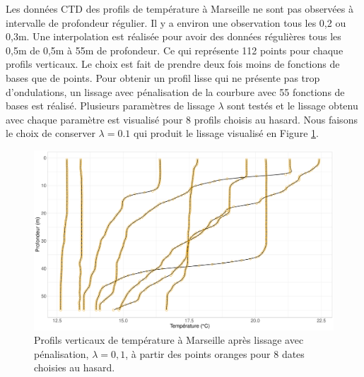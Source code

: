 \documentclass[12pt]{article}
\begin{document}
Les données CTD des profils de température à Marseille ne sont pas observées à intervalle de profondeur régulier. Il y a environ une observation tous les 0,2 ou 0,3m. Une interpolation est réalisée pour avoir des données régulières tous les 0,5m de 0,5m à 55m de profondeur. Ce qui représente 112 points pour chaque profils verticaux. Le choix est fait de prendre deux fois moins de fonctions de bases que de points. Pour obtenir un profil lisse qui ne présente pas trop d'ondulations, un lissage avec pénalisation de la courbure avec 55 fonctions de bases est réalisé. Plusieurs paramètres de lissage $\lambda$ sont testés et le lissage obtenu avec chaque paramètre est visualisé pour 8 profils choisis au hasard. Nous faisons le choix de conserver $\lambda = 0.1$ qui produit le lissage visualisé en Figure \ref{lambda_ctd}. 

\begin{figure}
\centering
\includegraphics[width=.75\textwidth]{fig/R131_prof_lambda.pdf}
\caption{Profils verticaux de température à Marseille après lissage avec pénalisation, $\lambda=0,1$, à partir des points oranges pour 8 dates choisies au hasard.}
\label{lambda_ctd}
\end{figure}
\end{document}
